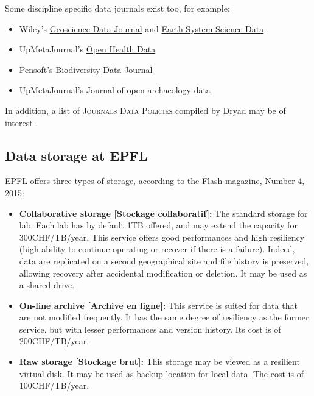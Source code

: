 Some discipline specific data journals exist too, for example:
\begin{itemize}
\item {}  Wiley's \href{http://onlinelibrary.wiley.com/journal/10.1002/%28ISSN%292049-6060}{Geoscience Data Journal} and \href{http://www.earth-system-science-data.net/}{Earth System Science Data} \cite{earth_system_science_data_essd_2015}
\item {} UpMetaJournal's \href{http://openhealthdata.metajnl.com/}{Open Health Data} \cite{upmetajournals_open_2015}
\item {} Pensoft's \href{http://biodiversitydatajournal.com/}{Biodiversity Data Journal} \cite{pensoft_biodiversity_2015}
\item {} UpMetaJournal's \href{http://openarchaeologydata.metajnl.com/}{Journal of open archaeology data} \cite{upmetajournals_journal_2015}
\end{itemize}

\noindent In addition, a list of \textsc{\href{http://datadryad.org/pages/jdap}{Journals Data Policies}} compiled by Dryad may be of interest \cite{dryad_joint_2014}.

\subsection{Data storage at EPFL}
\label{epfl_storage}

EPFL offers three types of storage, according to the \href{http://mediacom.epfl.ch/files/content/sites/mediacom/files/Flash/Flash%2004-2015.pdf}{Flash magazine, Number 4, 2015}:
\begin{itemize}
\item \textbf{Collaborative storage [Stockage collaboratif]:} The standard storage for lab. Each lab has by default 1TB offered, and may extend the capacity for 300CHF/TB/year. This service offers good performances and high resiliency (high ability to continue operating or recover if there is a failure). Indeed, data are replicated on a second geographical site and file history is preserved, allowing recovery after accidental modification or deletion. It may be used as a shared drive.
\item \textbf{On-line archive [Archive en ligne]:} This service is suited for data that are not modified frequently. It has the same degree of resiliency as the former service, but with lesser performances and version history. Its cost is of 200CHF/TB/year.
\item \textbf{Raw storage [Stockage brut]:} This storage may be viewed as a resilient virtual disk. It may be used as backup location for local data. The cost is of 100CHF/TB/year.
\end{itemize}

